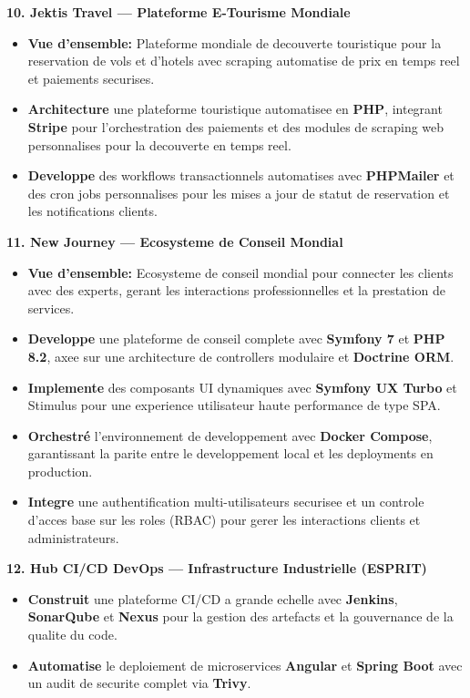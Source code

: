 \documentclass[10pt, letterpaper]{article}
\newenvironment{highlights}{
\begin{itemize}[leftmargin=12pt, itemsep=2pt]
}{
\end{itemize}
}
\begin{document}
\textbf{10. Jektis Travel --- Plateforme E-Tourisme Mondiale}
\begin{highlights}
\item \textbf{Vue d'ensemble:} Plateforme mondiale de decouverte touristique pour la reservation de vols et d'hotels avec scraping automatise de prix en temps reel et paiements securises.
\item \textbf{Architecture} une plateforme touristique automatisee en \textbf{PHP}, integrant \textbf{Stripe} pour l'orchestration des paiements et des modules de scraping web personnalises pour la decouverte en temps reel.
\item \textbf{Developpe} des workflows transactionnels automatises avec \textbf{PHPMailer} et des cron jobs personnalises pour les mises a jour de statut de reservation et les notifications clients.
\end{highlights}

\textbf{11. New Journey --- Ecosysteme de Conseil Mondial}
\begin{highlights}
\item \textbf{Vue d'ensemble:} Ecosysteme de conseil mondial pour connecter les clients avec des experts, gerant les interactions professionnelles et la prestation de services.
\item \textbf{Developpe} une plateforme de conseil complete avec \textbf{Symfony 7} et \textbf{PHP 8.2}, axee sur une architecture de controllers modulaire et \textbf{Doctrine ORM}.
\item \textbf{Implemente} des composants UI dynamiques avec \textbf{Symfony UX Turbo} et Stimulus pour une experience utilisateur haute performance de type SPA.
\item \textbf{Orchestré} l'environnement de developpement avec \textbf{Docker Compose}, garantissant la parite entre le developpement local et les deployments en production.
\item \textbf{Integre} une authentification multi-utilisateurs securisee et un controle d'acces base sur les roles (RBAC) pour gerer les interactions clients et administrateurs.
\end{highlights}

\textbf{12. Hub CI/CD DevOps --- Infrastructure Industrielle (ESPRIT)}
\begin{highlights}
\item \textbf{Construit} une plateforme CI/CD a grande echelle avec \textbf{Jenkins}, \textbf{SonarQube} et \textbf{Nexus} pour la gestion des artefacts et la gouvernance de la qualite du code.
\item \textbf{Automatise} le deploiement de microservices \textbf{Angular} et \textbf{Spring Boot} avec un audit de securite complet via \textbf{Trivy}.
\end{highlights}
\end{document}
